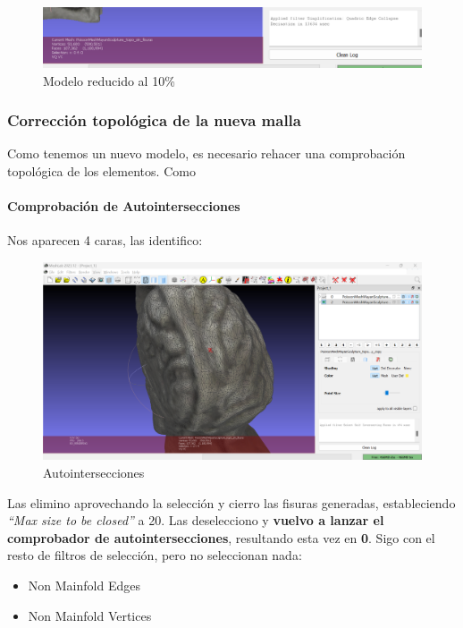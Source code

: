 \documentclass[options]{article}
\begin{document}
\begin{figure}[H]
    \centering
    \includegraphics[scale=0.55]{images/simplificacion_02.png}
    \caption{Modelo reducido al 10\%}
\end{figure}

\subsubsection{Corrección topológica de la nueva malla}

Como tenemos un nuevo modelo, es necesario rehacer una comprobación topológica de los elementos. Como   

\paragraph{Comprobación de Autointersecciones}

Nos aparecen 4 caras, las identifico:

\begin{figure}[H]
    \centering
    \includegraphics[scale=0.34]{images/simplificacion_03.png}
    \caption{Autointersecciones}
\end{figure}

Las elimino aprovechando la selección y cierro las fisuras generadas, estableciendo \textit{``Max size to be closed''} a 20. Las deselecciono y \textbf{vuelvo a lanzar el comprobador de autointersecciones}, resultando esta vez en \textbf{0}. Sigo con el resto de filtros de selección, pero no seleccionan nada:

\begin{itemize}
    \item Non Mainfold Edges
    \item Non Mainfold Vertices
\end{itemize}
\end{document}
